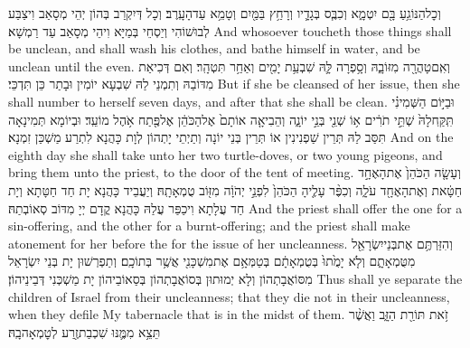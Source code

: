 {וְכׇל\maqqaf הַנּוֹגֵ֥עַ בָּ֖ם יִטְמָ֑א וְכִבֶּ֧ס בְּגָדָ֛יו וְרָחַ֥ץ בַּמַּ֖יִם וְטָמֵ֥א עַד\maqqaf הָעָֽרֶב׃}
{וְכָל דְּיִקְרַב בְּהוֹן יְהֵי מְסָאַב וִיצַבַּע לְבוּשׁוֹהִי וְיַסְחֵי בְּמַיָּא וִיהֵי מְסָאַב עַד רַמְשָׁא׃}
{And whosoever toucheth those things shall be unclean, and shall wash his clothes, and bathe himself in water, and be unclean until the even.}{}
{וְאִֽם\maqqaf טָהֲרָ֖ה מִזּוֹבָ֑הּ וְסָ֥פְרָה לָּ֛הּ שִׁבְעַ֥ת יָמִ֖ים וְאַחַ֥ר תִּטְהָֽר׃}
{וְאִם דְּכִיאַת מִדּוֹבַהּ וְתִמְנֵי לַהּ שִׁבְעָא יוֹמִין וּבָתַר כֵּן תִּדְכֵּי׃}
{But if she be cleansed of her issue, then she shall number to herself seven days, and after that she shall be clean.}{}
{וּבַיּ֣וֹם הַשְּׁמִינִ֗י תִּֽקַּֽח\maqqaf לָהּ֙ שְׁתֵּ֣י תֹרִ֔ים א֥וֹ שְׁנֵ֖י בְּנֵ֣י יוֹנָ֑ה וְהֵבִיאָ֤ה אוֹתָם֙ אֶל\maqqaf הַכֹּהֵ֔ן אֶל\maqqaf פֶּ֖תַח אֹ֥הֶל מוֹעֵֽד׃}
{וּבְיוֹמָא תְּמִינָאָה תִּסַּב לַהּ תְּרֵין שַׁפְנִינִין אוֹ תְּרֵין בְּנֵי יוֹנָה וְתַיְתֵי יָתְהוֹן לְוָת כָּהֲנָא לִתְרַע מַשְׁכַּן זִמְנָא׃}
{And on the eighth day she shall take unto her two turtle-doves, or two young pigeons, and bring them unto the priest, to the door of the tent of meeting.}{}
{וְעָשָׂ֤ה הַכֹּהֵן֙ אֶת\maqqaf הָאֶחָ֣ד חַטָּ֔את וְאֶת\maqqaf הָאֶחָ֖ד עֹלָ֑ה וְכִפֶּ֨ר עָלֶ֤יהָ הַכֹּהֵן֙ לִפְנֵ֣י יְהֹוָ֔ה מִזּ֖וֹב טֻמְאָתָֽהּ׃}
{וְיַעֲבֵיד כָּהֲנָא יָת חַד חַטָּתָא וְיָת חַד עֲלָתָא וִיכַפַּר עֲלַהּ כָּהֲנָא קֳדָם יְיָ מִדּוֹב סְאוֹבְתַהּ׃}
{And the priest shall offer the one for a sin-offering, and the other for a burnt-offering; and the priest shall make atonement for her before the \lord\space for the issue of her uncleanness.}{}
{וְהִזַּרְתֶּ֥ם אֶת\maqqaf בְּנֵי\maqqaf יִשְׂרָאֵ֖ל מִטֻּמְאָתָ֑ם וְלֹ֤א יָמֻ֙תוּ֙ בְּטֻמְאָתָ֔ם בְּטַמְּאָ֥ם אֶת\maqqaf מִשְׁכָּנִ֖י אֲשֶׁ֥ר בְּתוֹכָֽם׃}
{וְתַפְרְשׁוּן יָת בְּנֵי יִשְׂרָאֵל מִסּוֹאֲבָתְהוֹן וְלָא יְמוּתוּן בְּסוֹאֲבָתְהוֹן בְּסַאוֹבֵיהוֹן יָת מַשְׁכְּנִי דְּבֵינֵיהוֹן׃}
{Thus shall ye separate the children of Israel from their uncleanness; that they die not in their uncleanness, when they defile My tabernacle that is in the midst of them.}{}
{זֹ֥את תּוֹרַ֖ת הַזָּ֑ב וַאֲשֶׁ֨ר תֵּצֵ֥א מִמֶּ֛נּוּ שִׁכְבַת\maqqaf זֶ֖רַע לְטׇמְאָה\maqqaf בָֽהּ׃}
